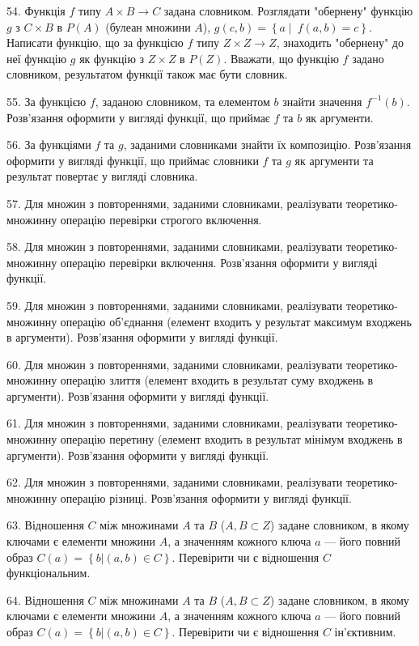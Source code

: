 \documentclass[10pt, ukrainian]{article}
\begin{document}
{\begin {Large}
54. Функція $f$ типу $A\times B \rightarrow C$ задана словником. Розглядати "обернену" функцію $g$ з $C \times B$  в $P(A)$ (булеан множини $A$), $g\left(c, b\right)=\left\{a\middle|\ f\left(a,b\right)=c\right\}$. Написати функцію, що за функцією $f$ типу $Z\times Z \rightarrow Z$, знаходить "обернену" до неї функцію $g$ як функцію з $Z\times Z$ в $P(Z)$. Вважати, що функцію $f$ задано словником, результатом функції також має бути словник.

55. За функцією $f$, заданою словником, та елементом $b$ знайти значення $f^{-1}(b)$. Розв’язання оформити у вигляді функції, що приймає $f$ та $b$ як аргументи.

\newpage

56. За функціями $f$ та $g$, заданими словниками знайти їх композицію. Розв’язання оформити у вигляді функції, що приймає словники $f$ та $g$ як аргументи та результат повертає у вигляді словника.

57. Для множин з повтореннями, заданими словниками, реалізувати теоретико-множинну операцію перевірки строгого включення. 

58. Для множин з повтореннями, заданими словниками, реалізувати теоретико-множинну операцію перевірки включення. Розв'яз\-ан\-ня оформити у вигляді функції.

59. Для множин з повтореннями, заданими словниками, реалізувати теоретико-множинну операцію об’єднання (елемент входить у результат максимум входжень в аргументи). Розв’язання оформити у вигляді функції.

60. Для множин з повтореннями, заданими словниками, реалізувати теоретико-множинну операцію
злиття (елемент входить в результат суму входжень в аргументи). Розв’язання оформити у вигляді функції.

61. Для множин з повтореннями, заданими словниками, реалізувати теоретико-множинну операцію перетину (елемент входить в результат мінімум входжень в аргументи). Розв’язання оформити у вигляді функції.

62. Для множин з повтореннями, заданими словниками, реалізувати теоретико-множинну операцію різниці. Розв’язання оформити у вигляді функції.

63. Відношення $C$ між множинами $A$ та $B$ ($A, B\subset Z$) задане словником, в якому ключами є елементи множини $A$, а значенням кожного ключа $a$ --- його повний образ $C\left(a\right)=\left\{b|\left(a,b\right)\in C\right\}$. Перевірити чи є відношення $C$ функціональним.

64. Відношення $C$ між множинами $A$ та $B$ ($A, B\subset Z$) задане словником, в якому ключами є елементи множини $A$, а значенням кожного ключа $a$ --- його повний образ $C\left(a\right)=\left\{b|\left(a,b\right)\in C\right\}$. Перевірити чи є відношення $C$ ін'єктивним.


\end{Large}}
\end{document}
